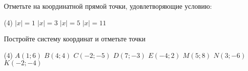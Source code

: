 \begin{homework}[number=1]
\begin{listofex}
	\item Отметьте на координатной прямой точки, удовлетворяющие условию:
	\begin{tasks}(4)
		\task \( |x|=1 \)
		\task \( |x|=3 \)
		\task \( |x|=5 \)
		\task \( |x|=11 \)
	\end{tasks}
	\item Постройте систему координат и отметьте точки
	\begin{tasks}(4)
		\task \( A(1;6) \)
		\task \( B(4;4) \)
		\task \( C(-2;-5) \)
		\task \( D(7;-3) \)
		\task \( E(-4;2) \)
		\task \( M(5;8) \)
		\task \( N(3;-6) \)
		\task \( K(-2;-4) \)
	\end{tasks}
	\end{listofex}
\end{homework}

